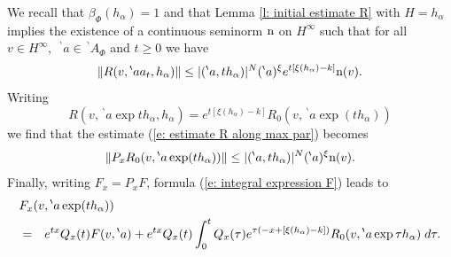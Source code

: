 \documentclass[12pt,a4paper]{article}
\def\ga{\alpha}
\def\gb{\beta}
\numberwithin{Thm}{section}
\numberwithin{equation}{section}
\numberwithin{equation}{section}
\def\bp{\!{\,}^\backprime}
\begin{document}
We recall that  $\gb_\Phi(h_\ga) = 1$ and that   
Lemma \ref{l: initial estimate R} with $H = h_\ga$ implies the 
existence of a continuous seminorm 
${\rm n}$ on $H^\infty$ such that for all  $v \in H^\infty,$ $\bp a\in \bp A_\Phi$ and $t \geq 0$ we have 
\begin{equation}
\label{e: estimate R along max par}
\|R(v,\bp aa_t , h_\ga) \| \leq |(\bp a , t h_\ga)|^N (\bp a)^\xi e^{t[\xi(h_\ga) - k]} {\rm n}(v).
\end{equation}
Writing 
$$ 
R(v, \bp a\exp t h_\ga, h_\ga) = e^{t [\xi (h_\ga) - k]} R_0(v, \bp a \exp(t h_\ga))
$$%
we find that the estimate (\ref{e: estimate R along max par}) becomes
\begin{equation}
\label{e: estimate Px of R0}
\|P_x R_0(v, \bp a \exp(t h_\ga))\| \leq |(\bp a, th_\ga)|^N (\bp a)^\xi {\rm n} (v).
\end{equation} 
Finally, writing $F_x = P_x F$, 
formula (\ref{e: integral expression F}) leads to 
\begin{eqnarray}
\label{e: F x and integral}
\lefteqn{F_x(v, \bp a\exp (th_\ga))} \\ \nonumber
&=& e^{tx} Q_x(t) F(v,\bp a) +
e^{t x} Q_x(t) \int_0^t Q_x(\tau) e^{\tau(- x + [\xi(h_\ga) - k])} 
R_{0} (v, \bp a \exp \tau h_\ga)\; d\tau.
\end{eqnarray}
\end{document}
